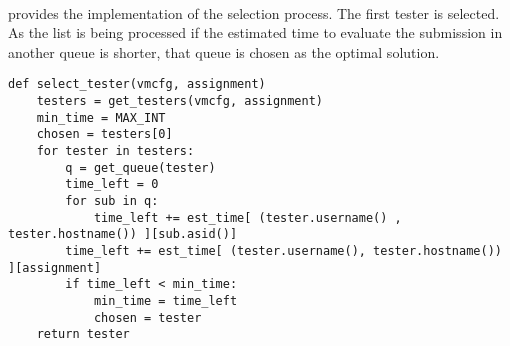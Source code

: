 \paragraph {}
\paragraph {}
\paragraph {}

 provides the implementation of the 
selection process. The first tester is selected. As the list is being processed
if the estimated time to evaluate the submission in another queue is shorter,
that queue is chosen as the optimal solution.

\lstset{caption=Selecting the best tester, language=python, label=lst:tester-select}
\begin{lstlisting}
def select_tester(vmcfg, assignment)
    testers = get_testers(vmcfg, assignment)
    min_time = MAX_INT
    chosen = testers[0]
    for tester in testers:
        q = get_queue(tester)
        time_left = 0
        for sub in q:
            time_left += est_time[ (tester.username() , tester.hostname()) ][sub.asid()]
        time_left += est_time[ (tester.username(), tester.hostname()) ][assignment]
        if time_left < min_time:
            min_time = time_left
            chosen = tester
    return tester
\end{lstlisting}    

